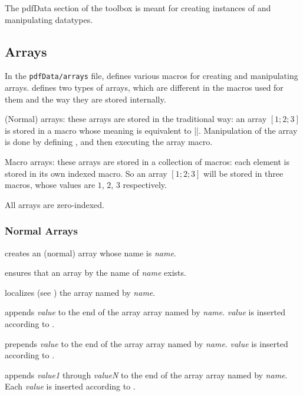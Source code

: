 The pdfData section of the \pdftoolbox{} toolbox is meant for creating instances of and manipulating datatypes.

\subsection{Arrays}

In the {\tt pdfData/arrays} file, \pdftoolbox{} defines various macros for creating and manipulating arrays.
\pdftoolbox{} defines two types of arrays, which are different in the macros used for them and the way they are stored internally.
\blist
    \item (Normal) arrays: these arrays are stored in the traditional way: an array $[1;2;3]$ is stored in a macro whose meaning is equivalent to \inlinecode||.
    Manipulation of the array is done by defining \macro\X, and then executing the array macro.
    \item Macro arrays: these arrays are stored in a collection of macros: each element is stored in its own indexed macro.
    So an array $[1;2;3]$ will be stored in three macros, whose values are $1$, $2$, $3$ respectively.
\elist

\bnote

    All arrays are zero-indexed.

\eppbox

\subsubsection{Normal Arrays}

creates an (normal) array whose name is {\it name}.
\emacroexp

ensures that an array by the name of {\it name} exists.
\emacroexp

localizes (see ) the array named by {\it name}.
\emacroexp

appends {\it value} to the end of the array array named by {\it name}.
{\it value} is inserted according to \gotomacro\currdef.
\emacroexp

prepends {\it value} to the end of the array array named by {\it name}.
{\it value} is inserted according to \gotomacro\currdef.
\emacroexp

appends {\it value1} through {\it valueN} to the end of the array array named by {\it name}.
Each {\it value} is inserted according to \gotomacro\currdef.
\emacroexp

